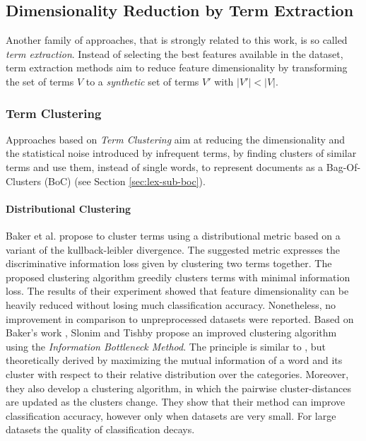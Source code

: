 \subsection{Dimensionality Reduction by Term Extraction}
Another family of approaches, that is strongly related to this work, is so called
\emph{term extraction}. Instead of selecting the best features available in the
dataset, term extraction methods aim to reduce feature dimensionality by
transforming the set of terms $V$ to a \emph{synthetic} set of terms $V'$ with
$|V'| < |V|$.
\cite{sebastiani2002machine}

\subsubsection{Term Clustering}
\label{sss:term-clustering}
Approaches based on \emph{Term Clustering} aim at reducing the dimensionality
and the statistical noise introduced by infrequent terms, by finding
clusters of similar terms and use them, instead of single words, to represent
documents as a Bag-Of-Clusters (BoC) (see Section \ref{sec:lex-sub-boc}).

\paragraph{Distributional Clustering}

Baker et al. \cite{baker1998distributional} propose to cluster terms using a distributional 
metric based on a variant of the kullback-leibler divergence. The suggested
metric expresses the discriminative information loss given by clustering two terms together.
The proposed clustering algorithm greedily clusters terms with minimal
information loss. The results of their experiment showed that feature
dimensionality can be heavily reduced without losing much classification accuracy.
Nonetheless, no improvement in comparison to unpreprocessed datasets were
reported. Based on Baker's work \cite{baker1998distributional},
Slonim and Tishby \cite{slonim2001power} propose an improved clustering
algorithm using the \emph{Information Bottleneck Method}. The principle is similar to
\cite{baker1998distributional}, but theoretically derived by maximizing the
mutual information of a word and its cluster with respect to their relative
distribution over the categories. Moreover, they also develop a clustering
algorithm, in which the pairwise cluster-distances are updated as the clusters
change.
They show that their method can improve classification accuracy, however only when datasets are very small. 
For large datasets the quality of classification decays.

